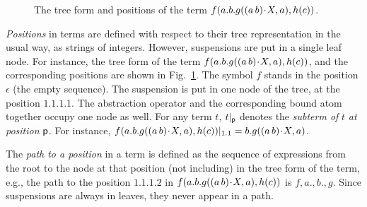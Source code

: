 \documentclass{llncs}
\newcommand{\swap}[2]{\ensuremath{(#1\, #2)}}
\newcommand{\permap}{{\mkern 1mu\cdot \mkern 1mu}}
\newcommand\pos{{\sf p}}
\begin{document}
  \begin{figure}
\caption{The tree form and positions of the term $f(a.b.g(\swap{a}{b}\permap X,a), h(c))$.}
\label{fig:tree}
\end{figure}

\emph{Positions} in terms are defined with respect to their tree
representation in the usual way, as strings of integers. However,
suspensions are put in a single leaf node. For instance, the
tree form of the term $f(a.b.g(\swap{a}{b}\permap X,a), h(c))$, and
the corresponding positions are shown in Fig.~\ref{fig:tree}. The
symbol $f$ stands in the position $\epsilon$ (the empty sequence). The
suspension is put in one node of the tree, at the position
$1.1.1.1$. The abstraction operator and the corresponding bound atom
together occupy one node as well. For any term $t$, $t|_\pos$ denotes
the \emph{subterm of} $t$ \emph{at position} $\pos$. For instance,
$f(a.b.g(\swap{a}{b}\permap X,a), h(c))|_{1.1}=b.g(\swap{a}{b}\permap X,a)$.

The \emph{path to a position} in a term is defined as the
sequence of expressions from the root to the node at that position (not
including) in the tree form of the term, e.g., the
path to the position $1.1.1.2$ in $f(a.b.g(\swap{a}{b}\permap X,a), h(c))$ is $f,a.,b.,g$. Since suspensions are always in leaves, they never appear in a path.
\end{document}
